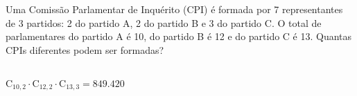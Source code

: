 \begin{ex}
Uma Comissão Parlamentar de Inquérito (CPI) é formada por 7 representantes de 3 partidos: 2 do partido A, 2 do partido B e 3 do partido C. O total de parlamentares do partido A é 10, do partido B é 12 e do partido C é 13. Quantas CPIs diferentes podem ser formadas?
 \begin{sol}
   \phantom{A}  \\
   $\mathrm{C}_{{10},2}\cdot\mathrm{C}_{{12},2}\cdot\mathrm{C}_{{13},3}=849.420$
 \end{sol}
\end{ex}